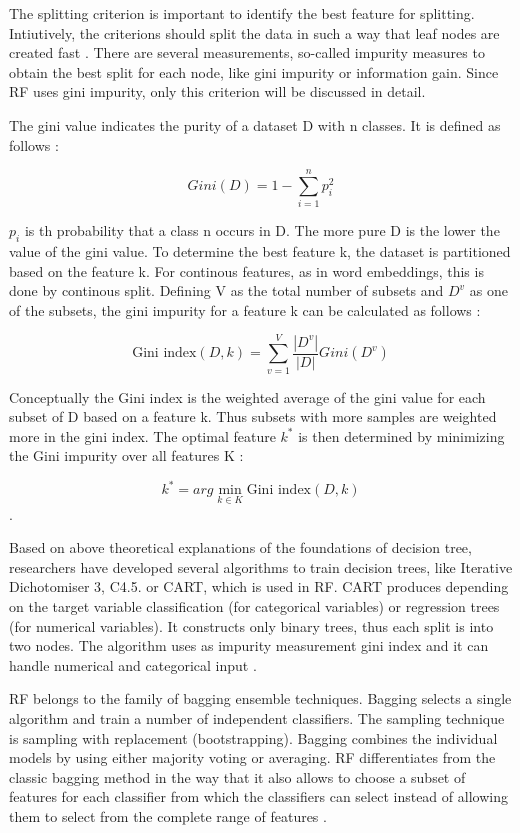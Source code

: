 \documentclass[12pt, a4paper, titlepage]{article}
\begin{document}
The splitting criterion is important to identify the best feature for splitting. Intiutively, the criterions should split the data in such a way that leaf nodes are created fast \citep{Berthold2020}. There are several measurements, so-called impurity measures to obtain the best split for each node, like gini impurity or information gain. Since \ac{RF} uses gini impurity, only this criterion will be discussed in detail. 

The gini value indicates the purity of a dataset D with n classes. It is defined as follows \citep[3156]{yuan2021}: 

\[Gini(D) = 1 - \sum_{i=1}^n p^2_i\]

$p_i$ is th probability that a class n occurs in D. The more pure D is the lower the value of the gini value. To determine the best feature k, the dataset is partitioned based on the feature k. For continous features, as in word embeddings, this is done by continous split. Defining V as the total number of subsets and $D^v$ as one of the subsets, the gini impurity for a feature k can be calculated as follows \cite{yuan2021}: 

\[\text{Gini index}(D,k) = \sum_{v=1}^V \frac{|D^v|}{|D|} Gini(D^v) \]

Conceptually the Gini index is the weighted average of the gini value for each subset of D based on a feature k. Thus subsets with more samples are weighted more in the gini index. The optimal feature $k^*$ is then determined by minimizing the Gini impurity over all features K \citep[3156]{yuan2021}: 

\[ k^* = arg \min_{k \in K} \text{Gini index} (D,k) \]. 

Based on above theoretical explanations of the foundations of decision tree, researchers have developed several algorithms to train decision trees, like Iterative Dichotomiser 3, C4.5. or \ac{CART}, which is used in \ac{RF}. \ac{CART} produces depending on the target variable classification (for categorical variables) or regression trees (for numerical variables). It constructs only binary trees, thus each split is into two nodes. The algorithm uses as impurity measurement gini index and it can handle numerical and categorical input \citep{brijain2014}.

\ac{RF} belongs to the family of bagging ensemble techniques.
Bagging selects a single algorithm and train a number of independent classifiers. The sampling technique is sampling with replacement (bootstrapping). Bagging combines the individual models by using either majority voting or averaging. \ac{RF} differentiates from the classic bagging method in the way that it also allows to choose a subset of features for each classifier from which the classifiers can select instead of  allowing them to select from the complete range of features \citep{polikar2012, zhou2009, Berthold2020}. 
\end{document}
